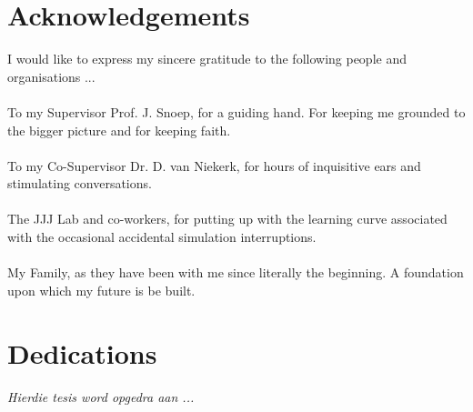 \begin{abstract}[english]%

\end{abstract}


\begin{abstract}[afrikaans]%

\end{abstract}


\chapter{Acknowledgements}%

I would like to express my sincere gratitude to the following people
and organisations ...
\\~\\
To my Supervisor Prof. J. Snoep, for a guiding hand. For keeping me grounded to the bigger picture and for keeping faith.
\\~\\
To my Co-Supervisor Dr. D. van Niekerk, for hours of inquisitive ears and stimulating conversations.
\\~\\
The JJJ Lab and co-workers, for putting up with the learning curve associated with the occasional accidental simulation interruptions.
\\~\\
My Family, as they have been with me since literally the beginning. A foundation upon which my future is be built.




\chapter{Dedications}%
 \vfill
 \begin{Afr}
 \begin{center}\itshape
    Hierdie tesis word opgedra aan ...
 \end{center}
 \end{Afr}
 \vfill
 \clearpage

\endinput
